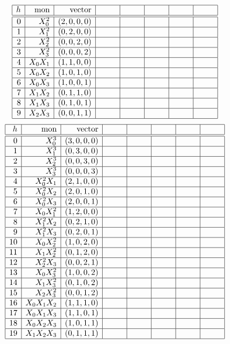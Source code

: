 {\renewcommand{\arraystretch}{1.8}
$$
\begin{array}{|r|r|r|*{5}{r|}}
\hline
h &  \mbox{mon} & \mbox{vector} & \ \ \ \ \ \ &\ \ \ \ \ \ &\ \ \ \ \ \ &\ \ \ \ \ \ &\ \ \ \ \ \ \\
\hline
\hline
0 & X_0^2 & ( 2, 0, 0, 0 )&&&&&\\
\hline
1 & X_1^2 & ( 0, 2, 0, 0 )&&&&&\\
\hline
2 & X_2^2 & ( 0, 0, 2, 0 )&&&&&\\
\hline
3 & X_3^2 & ( 0, 0, 0, 2 )&&&&&\\
\hline
4 & X_0X_1 & ( 1, 1, 0, 0 )&&&&&\\
\hline
5 & X_0X_2 & ( 1, 0, 1, 0 )&&&&&\\
\hline
6 & X_0X_3 & ( 1, 0, 0, 1 )&&&&&\\
\hline
7 & X_1X_2 & ( 0, 1, 1, 0 )&&&&&\\
\hline
8 & X_1X_3 & ( 0, 1, 0, 1 )&&&&&\\
\hline
9 & X_2X_3 & ( 0, 0, 1, 1 )&&&&&\\
\hline
\end{array}
$$
\clearpage
$$
\begin{array}{|r|r|r|*{5}{r|}}
\hline
h &  \mbox{mon} & \mbox{vector} & \ \ \ \ \ \ &\ \ \ \ \ \ &\ \ \ \ \ \ &\ \ \ \ \ \ &\ \ \ \ \ \ \\
\hline
\hline
0 & X_0^3 & ( 3, 0, 0, 0 )&&&&&\\
\hline
1 & X_1^3 & ( 0, 3, 0, 0 )&&&&&\\
\hline
2 & X_2^3 & ( 0, 0, 3, 0 )&&&&&\\
\hline
3 & X_3^3 & ( 0, 0, 0, 3 )&&&&&\\
\hline
4 & X_0^2X_1 & ( 2, 1, 0, 0 )&&&&&\\
\hline
5 & X_0^2X_2 & ( 2, 0, 1, 0 )&&&&&\\
\hline
6 & X_0^2X_3 & ( 2, 0, 0, 1 )&&&&&\\
\hline
7 & X_0X_1^2 & ( 1, 2, 0, 0 )&&&&&\\
\hline
8 & X_1^2X_2 & ( 0, 2, 1, 0 )&&&&&\\
\hline
9 & X_1^2X_3 & ( 0, 2, 0, 1 )&&&&&\\
\hline
10 & X_0X_2^2 & ( 1, 0, 2, 0 )&&&&&\\
\hline
11 & X_1X_2^2 & ( 0, 1, 2, 0 )&&&&&\\
\hline
12 & X_2^2X_3 & ( 0, 0, 2, 1 )&&&&&\\
\hline
13 & X_0X_3^2 & ( 1, 0, 0, 2 )&&&&&\\
\hline
14 & X_1X_3^2 & ( 0, 1, 0, 2 )&&&&&\\
\hline
15 & X_2X_3^2 & ( 0, 0, 1, 2 )&&&&&\\
\hline
16 & X_0X_1X_2 & ( 1, 1, 1, 0 )&&&&&\\
\hline
17 & X_0X_1X_3 & ( 1, 1, 0, 1 )&&&&&\\
\hline
18 & X_0X_2X_3 & ( 1, 0, 1, 1 )&&&&&\\
\hline
19 & X_1X_2X_3 & ( 0, 1, 1, 1 )&&&&&\\
\hline
\end{array}
$$}
